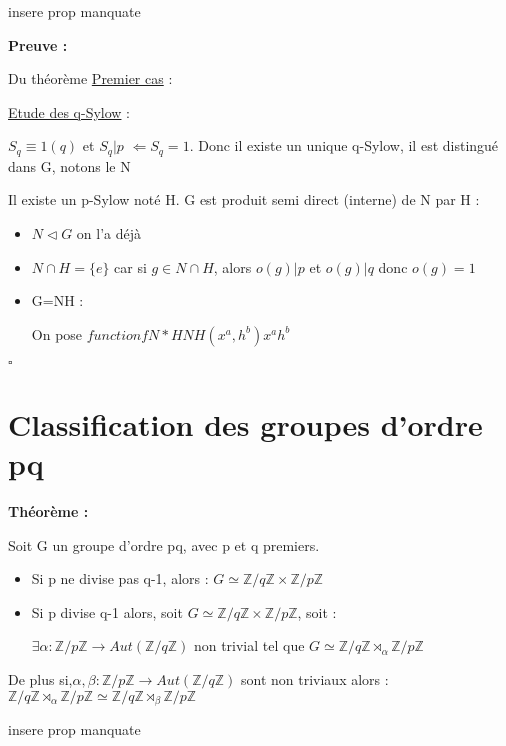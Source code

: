 \documentclass{report}
\renewenvironment{leftbar}{%
  \def\FrameCommand{\vrule width 0.4pt \hspace{10pt}}%
  \MakeFramed {\advance\hsize-\width \FrameRestore}}%
 {\endMakeFramed}%
\newenvironment{preuve}{\vspace*{0.5cm}
    \begin{leftbar}
    \noindent\textbf{Preuve :}\par}{
    \begin{flushright}
    $\square$
    \end{flushright}
    \end{leftbar}
}
\newenvironment{theoreme}[1][]{
    \begin{tcolorbox}[]
    \textbf{Théorème :} #1  \par} 
    {\end{tcolorbox}}
\newcommand{\Z}{\mathbb{Z}}
\newcommand{\dsp}{\displaystyle}
\begin{document}
insere prop manquate

\begin{preuve} Du théorème
\underline{Premier cas} :\par
\underline{Etude des q-Sylow} :

$S_{q}\equiv 1(q)$ et  $S_{q} | p$ $\Longleftarrow S_{q} = 1$. Donc il existe un unique q-Sylow, il est distingué dans G, notons le N


Il existe un p-Sylow noté H. G est produit semi direct (interne) de N par H :
\begin{itemize}
\item $N\triangleleft G$ on l'a déjà
\item $N\cap H = \{e\}$ car si $g \in N\cap H$, alors $o(g)|p$ et $o(g)|q$ donc $o(g)=1$
\item G=NH :\par 
On pose $function{f}{N* H}{NH}{(x^{a},h^{b})}{x^{a}h^{b}}$
\end{itemize}


\end{preuve}







\section{Classification des groupes d'ordre pq}


\begin{theoreme}
Soit G un groupe d'ordre pq, avec p et q premiers.
\begin{itemize}[label = -]
\item Si p ne divise pas q-1, alors : $\dsp G \simeq \Z/q\Z \times \Z/p\Z$
\item Si p divise q-1 alors, soit $\dsp G \simeq \Z/q\Z \times \Z/p\Z$, soit :\par
	$\exists \alpha : \Z/p\Z \longrightarrow Aut(\Z/q\Z)$ non trivial tel que $G \simeq \Z/q\Z \rtimes_{\alpha} \Z/p\Z$
\end{itemize}

De plus si,$\alpha ,\beta : \Z/p\Z \longrightarrow Aut(\Z/q\Z) $ sont non triviaux alors : $\Z/q\Z \rtimes_{\alpha} \Z/p\Z \simeq \Z/q\Z \rtimes_{\beta} \Z/p\Z $

\end{theoreme}


insere prop manquate
\end{document}

